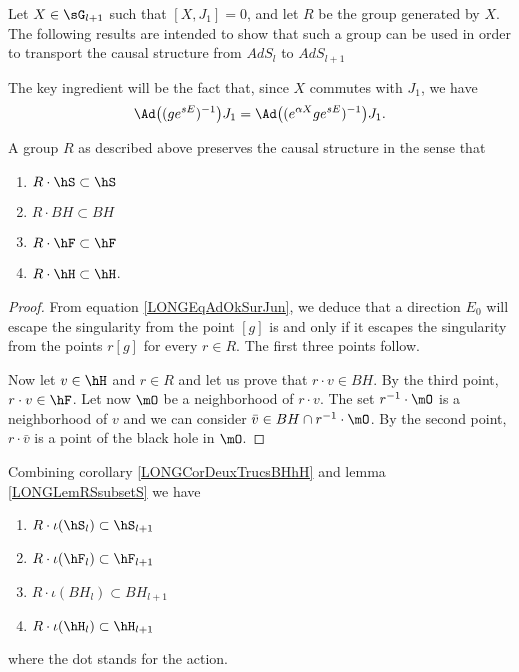 Let $X\in\sG_{l+1}$ such that $[X,J_1]=0$, and let $R$ be the group generated by $X$. The following results are intended to show that such a group can be used in order to transport the causal structure from $AdS_l$ to $AdS_{l+1}$

The key ingredient will be the fact that, since $X$ commutes with $J_1$, we have
\begin{equation}		\label{LONGEqAdOkSurJun}
	\Ad\big( (g e^{sE})^{-1} \big)J_1=\Ad\big( ( e^{\alpha X}g e^{sE})^{-1} \big)J_1.
\end{equation}

\begin{lemma}		\label{LONGLemRSsubsetS}
	A group $R$ as described above preserves the causal structure in the sense that
	\begin{multicols}{2}
	\begin{enumerate}

		\item
			$R\cdot\hS\subset\hS$
		\item
			$R\cdot BH\subset BH$
		\item
			$R\cdot \hF\subset\hF$
		\item
			$R\cdot \hH\subset\hH$.

	\end{enumerate}
	\end{multicols}
\end{lemma}

\begin{proof}
	From equation \eqref{LONGEqAdOkSurJun}, we deduce that a direction $E_0$ will escape the singularity from the point $[g]$ is and only if it escapes the singularity from the points $r[g]$ for every $r\in R$. The first three points follow.

	Now let $v\in\hH$ and $r\in R$ and let us prove that $r\cdot v\in BH$. By the third point, $r\cdot v\in\hF$. Let now $\mO$ be a neighborhood of $r\cdot v$. The set $r^{-1}\cdot \mO$ is a neighborhood of $v$ and we can consider $\bar v\in BH\cap r^{-1}\cdot\mO$. By the second point, $r\cdot \bar v$ is a point of the black hole in $\mO$.
\end{proof}

\begin{remark}		\label{LONGRemdqnqRSlsubsetSlpu}
	Combining corollary \ref{LONGCorDeuxTrucsBHhH} and lemma \ref{LONGLemRSsubsetS} we have
	\begin{multicols}{2}
	\begin{enumerate}
		\item
			$ R\cdot\iota(\hS_l)\subset\hS_{l+1}$
		\item
			$ R\cdot\iota(\hF_l)\subset\hF_{l+1}$
		\item
			$ R\cdot\iota(BH_{l})\subset BH_{l+1}$
		\item
			$ R\cdot\iota(\hH_{l})\subset\hH_{l+1}$
	\end{enumerate}
	\end{multicols}
    where the dot stands for the action.
\end{remark}


